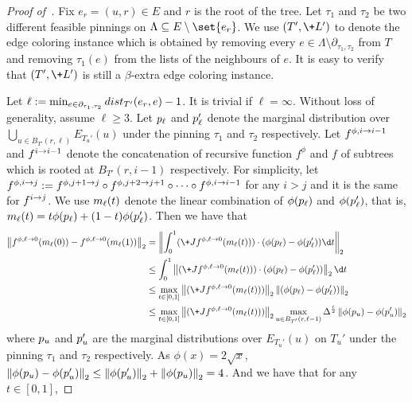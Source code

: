\documentclass[a4paper,11pt]{article}
\renewcommand{\norm}[1]{\left\|#1\right\|}
\begin{document}
\begin{proof}[Proof of~]
Fix $e_r = (u, r)\in E$ and $r$ is the root of the tree.
Let $\tau_1$ and $\tau_2$ be two different feasible pinnings on $\Lambda \subseteq E\setminus \set{e_r}$.
We use $(T',\+L')$ to denote the edge coloring instance which is obtained by removing every $e\in \Lambda \setminus \partial_{\tau_1,\tau_2}$ from $T$ and removing $\tau_1(e)$ from the lists of the neighbours of $e$. It is easy to verify that $(T',\+L')$ is still a $\beta$-extra edge coloring instance.

Let $\ell := \min_{e\in \partial_{\tau_1,\tau_2}} \-{dist}_{T'}(e_r,e) - 1$.
It is trivial if $\ell = \infty$.
Without loss of generality, assume $\ell \geq 3$.
Let $\*p_\ell$ and $\*p_\ell'$ denote the marginal distribution over $\bigcup_{u\in B_{T'}(r,\ell)} E_{T_u'}(u)$ under the pinning $\tau_1$ and $\tau_2$ respectively.
Let $f^{\phi,i\rightarrow i-1}$ and $f^{i\rightarrow i-1}$ denote the concatenation of recursive function $f^\phi$ and $f$ of subtrees which is rooted at $B_{T'}(r, i-1)$ respectively.
For simplicity, let $f^{\phi,i\rightarrow j} := f^{\phi,j+1\rightarrow j} \circ f^{\phi,j+2\rightarrow j+1} \circ \dots \circ f^{\phi,i\rightarrow i-1}$ for any $i > j$ and it is the same for $f^{i\rightarrow j}$.
We use $\*m_\ell(t)$ denote the linear combination of  $\phi(\*p_\ell)$ and $\phi(\*p_\ell')$, that is,
$\*m_\ell(t) = t\phi(\*p_\ell) + (1-t) \phi(\*p_\ell')$.
Then we have that
\begin{align}
    \nonumber \norm{f^{\phi,\ell\ra 0}(\*m_\ell(0)) - f^{\phi,\ell\ra 0}(\*m_\ell(1))}_2
    &= \norm{\int_0^1 (\+J f^{\phi,\ell\ra 0}(\*m_\ell(t))) \cdot (\phi(\*p_\ell) - \phi(\*p_\ell')) \d t}_2
    \\\nonumber &\leq \int_0^1 \norm{ (\+J f^{\phi,\ell\ra 0}(\*m_\ell(t))) \cdot (\phi(\*p_\ell) - \phi(\*p_\ell')) }_2\d t
    \\\nonumber &\leq \max_{t\in[0,1]} \norm{ (\+J f^{\phi,\ell\ra 0}(\*m_\ell(t)))}_2\norm{(\phi(\*p_\ell) - \phi(\*p_\ell')) }_2
    \\ \label{eq:contraction} &\leq \max_{t\in[0,1]} \norm{ (\+J f^{\phi,\ell\ra 0}(\*m_\ell(t)))}_2
    \max_{u\in B_{T'}(r,\ell-1)}\Delta^{\frac{\ell}{2}}\norm{\phi(\*p_u) - \phi(\*p_u')}_2
\end{align}
where $\*p_u$ and $\*p_u'$ are the marginal distributions over $E_{T_u'}(u)$ on $T_u'$ under the pinning $\tau_1$ and $\tau_2$ respectively.
As $\phi(x) = 2\sqrt{x}$, $\norm{\phi(\*p_u) - \phi(\*p_u')}_2 \leq \norm{\phi(\*p_u')}_2 + \norm{\phi(\*p_u)}_2 = 4$.
And we have that for any $t\in [0,1]$,

\end{proof}
\end{document}
